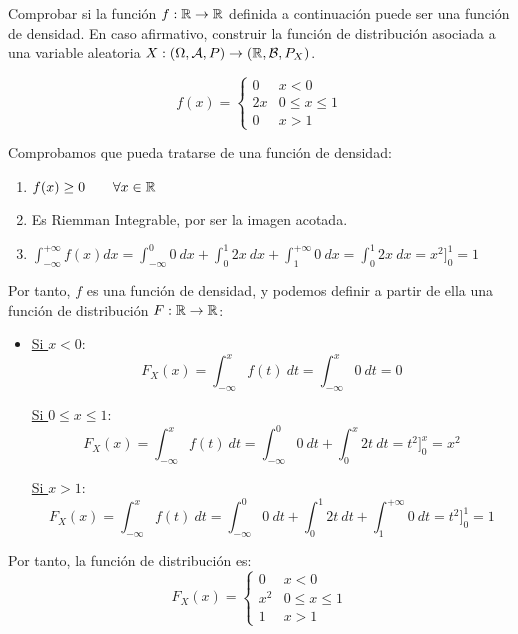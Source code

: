\begin{ejemplo}
    Comprobar si la función $f:\mathbb R \rightarrow \mathbb R$ definida a continuación puede ser una función de densidad. En caso afirmativo, construir la función de distribución asociada a una variable aleatoria $X:(\Omega, \mathcal{A}, P) \rightarrow (\mathbb R, \mathcal{B}, P_X)$.

    $$f(x) = \left\{ \begin{array}{ll}
        0  & x < 0           \\
        2x & 0 \leq x \leq 1 \\
        0  & x > 1
    \end{array} \right.$$
      
    Comprobamos que pueda tratarse de una función de densidad:
    \begin{enumerate}
        \item $f(x) \geq 0 \qquad \forall x \in \mathbb R$

        \item Es Riemman Integrable, por ser la imagen acotada.

        \item $\displaystyle \int_{-\infty}^{+\infty} f(x) dx = \int_{-\infty}^0 0~dx+ \int_0^1 2x~dx + \int_1^{+\infty}0~dx = \int_0^1 2x~dx = x^2]_0^1=1$
    \end{enumerate}

    Por tanto, $f$ es una función de densidad, y podemos definir a partir de ella una función de distribución $F:\mathbb R \rightarrow \mathbb R$:
    \begin{itemize}
        \item \underline{Si $x<0$}:
        $$F_X(x) = \int_{-\infty}^x f(t)~dt = \int_{-\infty}^x 0~dt = 0$$

        \underline{Si $0 \leq x \leq 1$}:
        $$F_X(x) = \int_{-\infty}^x f(t)~dt = \int_{-\infty}^0 0~dt + \int_{0}^x 2t~dt = t^2]_0^x = x^2$$
        
        
        \underline{Si $x>1$}:
        $$F_X(x) = \int_{-\infty}^x f(t)~dt = \int_{-\infty}^0 0~dt + \int_{0}^1 2t~dt + \int_1^{+\infty} 0~dt = t^2]_0^1 = 1$$
    \end{itemize}

    Por tanto, la función de distribución es:
    $$F_X(x) = \left\{ \begin{array}{lc}
        0   & x < 0           \\
        x^2 & 0 \leq x \leq 1 \\
        1   & x > 1
    \end{array} \right.$$
\end{ejemplo}


